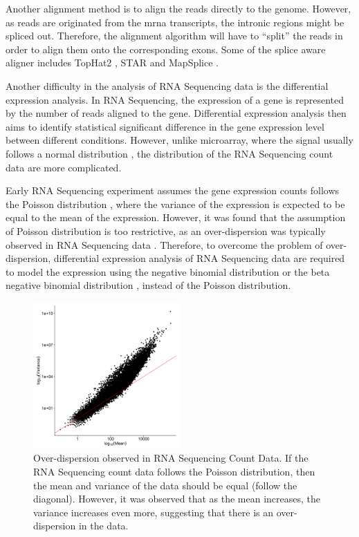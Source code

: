	Another alignment method is to align the reads directly to the genome. 
	However, as reads are originated from the \gls{mrna} transcripts, the intronic regions might be spliced out. 
	Therefore, the alignment algorithm will have to ``split'' the reads in order to align them onto the corresponding exons. 
	Some of the splice aware aligner includes TopHat2 \citep{Kim2013}, STAR \citep{Dobin2013} and MapSplice \citep{Wang2010}.
	
	Another difficulty in the analysis of RNA Sequencing data is the differential expression analysis. 
	In RNA Sequencing, the expression of a gene is represented by the number of reads aligned to the gene. 
	Differential expression analysis then aims to identify statistical significant difference in the gene expression level between different conditions. 
	However, unlike microarray, where the signal usually follows a normal distribution \citep{Hoyle2002,Giles2003}, the distribution of the RNA Sequencing count data are more complicated.
	
	Early RNA Sequencing experiment assumes the gene expression counts follows the Poisson distribution \citep{Marioni2008}, where the variance of the expression is expected to be equal to the mean of the expression.
	However, it was found that the assumption of Poisson distribution is too restrictive, as an over-dispersion was typically observed in RNA Sequencing data \citep{Anders2010}.
	Therefore, to overcome the problem of over-dispersion, differential expression analysis of RNA Sequencing data are required to model the expression using the negative binomial distribution \citep{Anders2010,Robinson2010} or the beta negative binomial distribution \citep{Trapnell2012}, instead of the Poisson distribution.

	\begin{figure}
		\centering
		\includegraphics[width=0.5\textwidth]{figure/overdispersion.png}
		\caption[Over-dispersion observed in RNA Sequencing Count Data]{
			Over-dispersion observed in RNA Sequencing Count Data.
			If the RNA Sequencing count data follows the Poisson distribution, then the mean and variance of the data should be equal (follow the diagonal). 
			However, it was observed that as the mean increases, the variance increases even more, suggesting that there is an over-dispersion in the data. 
		}
	\end{figure}
	
